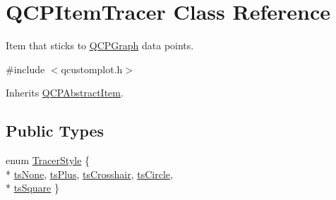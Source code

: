 \hypertarget{class_q_c_p_item_tracer}{\section{Q\-C\-P\-Item\-Tracer Class Reference}
\label{class_q_c_p_item_tracer}
}


Item that sticks to \hyperlink{class_q_c_p_graph}{Q\-C\-P\-Graph} data points.  




{\ttfamily \#include $<$qcustomplot.\-h$>$}



Inherits \hyperlink{class_q_c_p_abstract_item}{Q\-C\-P\-Abstract\-Item}.

\subsection*{Public Types}
\begin{DoxyCompactItemize}
\item 
enum \hyperlink{class_q_c_p_item_tracer_a2f05ddb13978036f902ca3ab47076500}{Tracer\-Style} \{ \\*
\hyperlink{class_q_c_p_item_tracer_a2f05ddb13978036f902ca3ab47076500aac27462c79146225bfa8fba24d2ee8a4}{ts\-None}, 
\hyperlink{class_q_c_p_item_tracer_a2f05ddb13978036f902ca3ab47076500a3323fb04017146e4885e080a459472fa}{ts\-Plus}, 
\hyperlink{class_q_c_p_item_tracer_a2f05ddb13978036f902ca3ab47076500af562ec81ac3ba99e26ef8540cf1ec16f}{ts\-Crosshair}, 
\hyperlink{class_q_c_p_item_tracer_a2f05ddb13978036f902ca3ab47076500ae2252c28f4842880d71e9f94e69de94e}{ts\-Circle}, 
\\*
\hyperlink{class_q_c_p_item_tracer_a2f05ddb13978036f902ca3ab47076500a4ed5f01f2c5fd86d980366d79f481b9b}{ts\-Square}
 \}
\end{DoxyCompactItemize}
